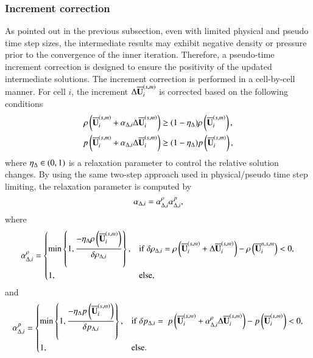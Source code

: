\subsubsection{Increment correction}
\label{ssec:increment-correction}

As pointed out in the previous subsection, even with limited physical and pseudo time step sizes, the intermediate results may exhibit negative density or pressure prior to the convergence of the inner iteration.
Therefore, a pseudo-time increment correction is designed to ensure the positivity of the updated intermediate solutions. The increment correction is performed in a cell-by-cell manner.
For cell $i$, the increment $\mathrm\Delta \overline{\mathbf{U}}_i^{\left(s,m\right)}$ is corrected based on the following conditions
\begin{equation}
    \label{eq:ppLimitInc}
    \begin{aligned}
        \rho\left(\overline{\mathbf{U}}_i^{\left(s,m\right)} + \alpha_{\mathrm\Delta,i} \mathrm\Delta \overline{\mathbf{U}}_i^{\left(s,m\right)}\right)
         & \geq
        (1- \eta_\mathrm\Delta)
        \rho\left(\overline{\mathbf{U}}_i^{\left(s,m\right)}\right), \\
        p\left(\overline{\mathbf{U}}_i^{\left(s,m\right)} + \alpha_{\mathrm\Delta,i} \mathrm\Delta \overline{\mathbf{U}}_i^{\left(s,m\right)}\right)
         & \geq
        (1- \eta_\mathrm\Delta)
        p\left(\overline{\mathbf{U}}_i^{\left(s,m\right)}\right),
    \end{aligned}
\end{equation}
where $\eta_\mathrm\Delta \in (0,1)$ is a relaxation parameter to control the relative solution changes.
By using the same two-step approach used in physical/pseudo time step limiting, the relaxation parameter is computed by
\begin{equation}
\label{eq:alpha-inc}
    \alpha_{\mathrm\Delta,i}= \alpha_{\mathrm\Delta,i}^{\rho} \alpha_{\mathrm\Delta,i}^{p},
\end{equation}
where
\begin{equation}
\label{eq:alpha-inc-rho}
    \alpha_{\mathrm\Delta,i}^{\rho} = \begin{dcases}
        \min\left\{1, \dfrac{-\eta_\mathrm\Delta \rho\left(\overline{\mathbf{U}}^{\left(s,m\right)}_i\right)}{\delta \rho_{\mathrm\Delta,i}} \right\}, & \mathrm{if} \ \delta \rho_{\mathrm\Delta,i} = \rho\left(\overline{\mathbf{U}}^{\left(s,m\right)}_i +\mathrm\Delta \overline{\mathbf{U}}_i^{\left(s,m\right)}\right)  -\rho\left(\overline{\mathbf{U}}^{n,s,m}_i\right) < 0, \\
        1, &
        \mathrm{else},
    \end{dcases}
\end{equation}
and
\begin{equation}
\label{eq:alpha-inc-p}
    \alpha_{\mathrm\Delta,i}^{p} = \begin{dcases}
        \min\left\{1, \dfrac{-\eta_\mathrm\Delta p \left(\overline{\mathbf{U}}^{\left(s,m\right)}_i\right)}{\delta p_{\mathrm\Delta,i}} \right\}, & \mathrm{if} \ \delta p_{\mathrm\Delta,i} = \ p \left(\overline{\mathbf{U}}^{\left(s,m\right)}_i + \alpha_{\mathrm\Delta,i}^{\rho} \mathrm\Delta \overline{\mathbf{U}}_i^{\left(s,m\right)}\right) - p \left(\overline{\mathbf{U}}^{\left(s,m\right)}_i\right) < 0, \\
        1, &
        \mathrm{else}.
    \end{dcases}
\end{equation}
